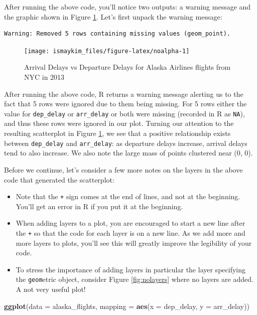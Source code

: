 \documentclass[12pt, krantz2,]{krantz}
\makeatletter
\newenvironment{Shaded}{\begin{snugshade}}{\end{snugshade}}
\newcommand{\DataTypeTok}[1]{\textcolor[rgb]{0.27,0.27,0.27}{#1}}
\newcommand{\KeywordTok}[1]{\textcolor[rgb]{0.27,0.27,0.27}{\textbf{#1}}}
\newcommand{\NormalTok}[1]{#1}
\providecommand{\tightlist}{%
  \setlength{\itemsep}{0pt}\setlength{\parskip}{0pt}}
\newenvironment{kframe}{%
\medskip{}
\setlength{\fboxsep}{.8em}
 \def\at@end@of@kframe{}%
 \ifinner\ifhmode%
  \def\at@end@of@kframe{\end{minipage}}%
  \begin{minipage}{\columnwidth}%
 \fi\fi%
 \def\FrameCommand##1{\hskip\@totalleftmargin \hskip-\fboxsep
 \colorbox{shadecolor}{##1}\hskip-\fboxsep
     \hskip-\linewidth \hskip-\@totalleftmargin \hskip\columnwidth}%
 \MakeFramed {\advance\hsize-\width
   \@totalleftmargin\z@ \linewidth\hsize
   \@setminipage}}%
 {\par\unskip\endMakeFramed%
 \at@end@of@kframe}
\renewenvironment{Shaded}{\begin{kframe}}{\end{kframe}}
\makeatother
\begin{document}
After running the above code, you'll notice two outputs: a warning message and the graphic shown in Figure \ref{fig:noalpha}. Let's first unpack the warning message:

\begin{verbatim}
Warning: Removed 5 rows containing missing values (geom_point).
\end{verbatim}

\begin{figure}

{\centering \texttt{[image: ismaykim\_files/figure-latex/noalpha-1]} 

}

\caption{Arrival Delays vs Departure Delays for Alaska Airlines flights from NYC in 2013}\label{fig:noalpha}
\end{figure}

After running the above code, R returns a warning message alerting us to the fact that 5 rows were ignored due to them being missing. For 5 rows either the value for \texttt{dep\_delay} or \texttt{arr\_delay} or both were missing (recorded in R as \texttt{NA}), and thus these rows were ignored in our plot. Turning our attention to the resulting scatterplot in Figure \ref{fig:noalpha}, we see that a positive relationship exists between \texttt{dep\_delay} and \texttt{arr\_delay}: as departure delays increase, arrival delays tend to also increase. We also note the large mass of points clustered near (0, 0).

Before we continue, let's consider a few more notes on the layers in the above code that generated the scatterplot:

\begin{itemize}
\tightlist
\item
  Note that the \texttt{+} sign comes at the end of lines, and not at the beginning. You'll get an error in R if you put it at the beginning.
\item
  When adding layers to a plot, you are encouraged to start a new line after the \texttt{+} so that the code for each layer is on a new line. As we add more and more layers to plots, you'll see this will greatly improve the legibility of your code.
\item
  To stress the importance of adding layers in particular the layer specifying the \texttt{geom}etric object, consider Figure \ref{fig:nolayers} where no layers are added. A not very useful plot!
\end{itemize}

\begin{Shaded}
\begin{Highlighting}[]
\KeywordTok{ggplot}\NormalTok{(}\DataTypeTok{data =}\NormalTok{ alaska_flights, }\DataTypeTok{mapping =} \KeywordTok{aes}\NormalTok{(}\DataTypeTok{x =}\NormalTok{ dep_delay, }\DataTypeTok{y =}\NormalTok{ arr_delay))}
\end{Highlighting}
\end{Shaded}
\end{document}
